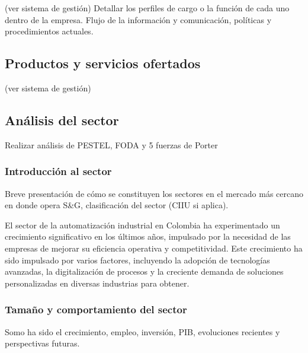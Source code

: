 \restoregeometry

(ver sistema de gestión)
Detallar los perfiles de cargo o la función de cada uno dentro de la empresa.
Flujo de la información y comunicación, políticas y procedimientos actuales.


\subsection{Productos y servicios ofertados} 
(ver sistema de gestión)

\subsection{Análisis del sector} 
Realizar análisis de PESTEL, FODA y 5 fuerzas de Porter

\subsubsection{Introducción al sector}
Breve presentación de cómo se constituyen los sectores en el mercado más cercano en donde opera S\&G, clasificación del sector (CIIU si aplica).

El sector de la automatización industrial en Colombia ha experimentado un crecimiento significativo en los últimos años, impulsado por la necesidad de las empresas de mejorar su eficiencia operativa y competitividad. Este crecimiento ha sido impulsado por varios factores, incluyendo la adopción de tecnologías avanzadas, la digitalización de procesos y la creciente demanda de soluciones personalizadas en diversas industrias para obtener.

\subsubsection{Tamaño y comportamiento del sector}
Somo ha sido el crecimiento, empleo, inversión, PIB, evoluciones recientes y perspectivas futuras.
